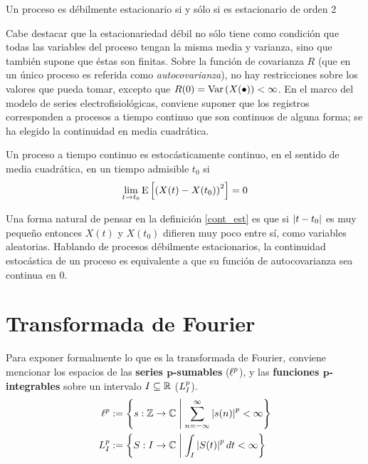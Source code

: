 \begin{proposicion}
Un proceso es débilmente estacionario si y sólo si es estacionario de orden 2
\end{proposicion}

Cabe destacar que la estacionariedad débil no sólo tiene como condición que todas las variables del
proceso tengan la misma media y varianza, sino que también supone que éstas son finitas.
%
Sobre la función de covarianza $R$ (que en un único proceso es referida como \textit{autocovarianza}),
no hay restricciones sobre los valores que pueda tomar, excepto que 
$R(0) = \mathrm{Var}\left( X(\bullet) \right) < \infty$. 
%
En el marco del modelo de series electrofisiológicas, conviene suponer que los registros 
corresponden a procesos a tiempo continuo que son continuos de alguna forma; se ha elegido la 
continuidad en media cuadrática.


\begin{definicion}
Un proceso a tiempo continuo \xt es estocásticamente continuo, en el sentido de media cuadrática, 
en un tiempo admisible $t_0$ si
\begin{equation*}
\lim_{t \rightarrow t_0} \mathrm{E}\left[ \left( X(t) - X(t_0) \right)^{2} \right] = 0
\end{equation*}
\label{cont_est}
\end{definicion}

Una forma natural de pensar en la definición \ref{cont_est} es que si $\left| t-t_0 \right|$ es muy pequeño 
entonces $X(t)$ y $X(t_0)$ difieren muy poco entre sí, como variables aleatorias.
%
Hablando de procesos débilmente estacionarios, la continuidad estocástica de un proceso es 
equivalente a que su función de autocovarianza sea continua en 0.


\section{Transformada de Fourier}

Para exponer formalmente lo que es la transformada de Fourier, conviene mencionar los espacios de 
las \textbf{series $\boldsymbol{p}$-sumables} ($\ell^{p}$), y las  \textbf{funciones 
$\boldsymbol{p}$-integrables} sobre un intervalo $I \subseteq \mathbb{R}$ ($L^{p}_I$).
\begin{align*}
\ell^{p} &:= \left\{ s: \mathbb{Z}\rightarrow\mathbb{C} \mathrel{}\middle|\mathrel{} \sum_{n=-\infty}^{\infty} \left| s(n) \right|^{p} < \infty \right\}
\\
L^{p}_I &:= \left\{ S: I\rightarrow\mathbb{C} \mathrel{}\middle|\mathrel{} \int_I \left| S(t) \right|^{p} dt < \infty \right\}
\end{align*}

